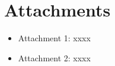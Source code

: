 \chapter{Attachments}

\begin{itemize}
	\item Attachment 1: xxxx
	\item Attachment 2: xxxx
\end{itemize}